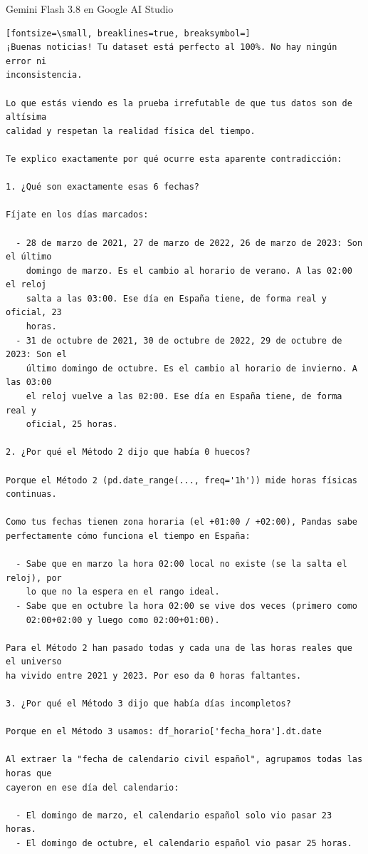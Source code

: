 \documentclass[12pt,a4paper,oneside]{book}
\begin{document}
\begin{iaresp}{Gemini Flash 3.8 en Google AI Studio}
\begin{Verbatim}[fontsize=\small, breaklines=true, breaksymbol=]
¡Buenas noticias! Tu dataset está perfecto al 100%. No hay ningún error ni
inconsistencia.

Lo que estás viendo es la prueba irrefutable de que tus datos son de altísima
calidad y respetan la realidad física del tiempo.

Te explico exactamente por qué ocurre esta aparente contradicción:

1. ¿Qué son exactamente esas 6 fechas?

Fíjate en los días marcados:

  - 28 de marzo de 2021, 27 de marzo de 2022, 26 de marzo de 2023: Son el último
    domingo de marzo. Es el cambio al horario de verano. A las 02:00 el reloj
    salta a las 03:00. Ese día en España tiene, de forma real y oficial, 23
    horas.
  - 31 de octubre de 2021, 30 de octubre de 2022, 29 de octubre de 2023: Son el
    último domingo de octubre. Es el cambio al horario de invierno. A las 03:00
    el reloj vuelve a las 02:00. Ese día en España tiene, de forma real y
    oficial, 25 horas.

2. ¿Por qué el Método 2 dijo que había 0 huecos?

Porque el Método 2 (pd.date_range(..., freq='1h')) mide horas físicas continuas.

Como tus fechas tienen zona horaria (el +01:00 / +02:00), Pandas sabe
perfectamente cómo funciona el tiempo en España:

  - Sabe que en marzo la hora 02:00 local no existe (se la salta el reloj), por
    lo que no la espera en el rango ideal.
  - Sabe que en octubre la hora 02:00 se vive dos veces (primero como
    02:00+02:00 y luego como 02:00+01:00).

Para el Método 2 han pasado todas y cada una de las horas reales que el universo
ha vivido entre 2021 y 2023. Por eso da 0 horas faltantes.

3. ¿Por qué el Método 3 dijo que había días incompletos?

Porque en el Método 3 usamos: df_horario['fecha_hora'].dt.date

Al extraer la "fecha de calendario civil español", agrupamos todas las horas que
cayeron en ese día del calendario:

  - El domingo de marzo, el calendario español solo vio pasar 23 horas.
  - El domingo de octubre, el calendario español vio pasar 25 horas.


\end{Verbatim}
\end{iaresp}
\end{document}
